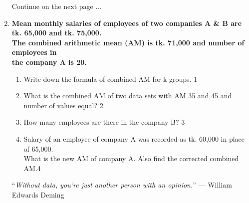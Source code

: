 \documentclass{article}
\begin{document}
\begin{enumerate}
  \vspace{1cm}
  
  \hfill Continue on the next page ...
  
  \newpage
     \item
	  \textbf{Mean monthly salaries of employees of two companies A \& B are tk. 
	  65,000 and tk. 75,000. \\ The combined arithmetic mean (AM) is tk. 
	  71,000 and number of employees in \\ the company A is 20.} 
	  
  \begin{enumerate}
    \item
	Write down the formula of combined AM for k groups. \hfill 1
    \item
	What is the combined AM of two data sets with AM 35 and 45 and number of 
	values equal? \hfill 2
    \item  
	How many employees are there in the company B? \hfill 3
    \item
	Salary of an employee of company A was recorded as tk. 60,000 in place of
	65,000. \\ What is the new AM of company A. Also find the corrected 
	combined AM.\hfill 4
  \end{enumerate}
  
  \vspace{3cm}
  
  \begin{center}
  
  “\textit{Without data, you’re just another person with an opinion.}” ---
  William Edwards Deming
  
  \end{center}

  
\end{enumerate}
\end{document}
